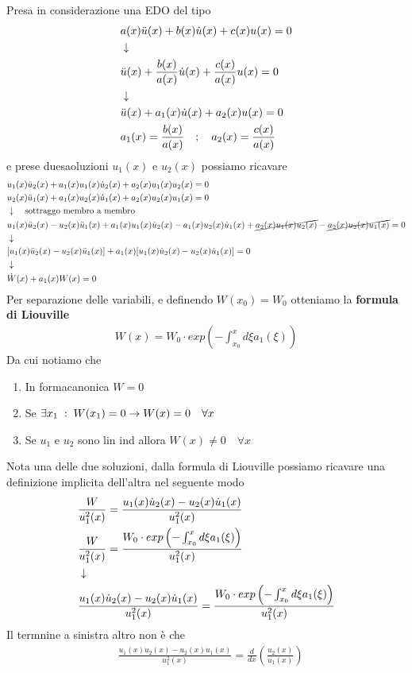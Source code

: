 Presa in considerazione una EDO del tipo
\begin{align}
	&a(x) \ddot{u}(x) + b(x) \dot{u}(x) + c(x) u(x) = 0 \\ &\downarrow \nonumber \\
	&\ddot{u}(x) + \frac{b(x)}{a(x)} \dot{u}(x) + \frac{c(x)}{a(x)} u(x) = 0\nonumber \\ &\downarrow \nonumber \\
	&\ddot{u}(x) + a_1(x) \dot{u}(x) + a_2(x) u(x) = 0 \\
	&a_1(x) =  \frac{b(x)}{a(x)} \quad ; \quad a_2(x)=\frac{c(x)}{a(x)}
\end{align}
e prese duesaoluzioni $u_1(x)$ e $u_2(x)$ possiamo ricavare
\begin{align}
	&u_1(x)\ddot{u}_2(x) + a_1(x) u_1(x)\dot{u}_2(x) + a_2(x) u_1(x)u_2(x) = 0 \\
	&u_2(x)\ddot{u}_1(x) + a_1(x) u_2(x)\dot{u}_1(x) + a_2(x) u_2(x)u_1(x) = 0\\ &\downarrow \quad \text{sottraggo membro a membro} \nonumber \\
	&u_1(x)\ddot{u}_2(x) - u_2(x)\ddot{u}_1(x) + a_1(x) u_1(x)\dot{u}_2(x) - a_1(x) u_2(x)\dot{u}_1(x) + \cancel{ a_2(x) u_1(x)u_2(x)} - \cancel{a_2(x) u_2(x)u_1(x)} = 0 \nonumber \\ &\downarrow \nonumber \\
	&[u_1(x)\ddot{u}_2(x) - u_2(x)\ddot{u}_1(x)]+ a_1(x) [  u_1(x)\dot{u}_2(x) - u_2(x)\dot{u}_1(x)] = 0\nonumber \\ &\downarrow \nonumber \\
	&\dot{W}(x) + a_1(x)W(x) = 0
\end{align}
Per separazione delle variabili, e definendo $W(x_0)=W_0$ otteniamo la \textbf{formula di Liouville}
\begin{align}
	W(x) = W_0\cdot exp\left( -\int_{x_0}^{x} d\xi a_1(\xi) \right)
\end{align}
Da cui notiamo che
\begin{enumerate}
	\item In formacanonica $W=0$
	\item Se $\exists x_1 \; : \; W(x_1) = 0 \to W(x) = 0\quad\forall x$
	\item Se $u_1$ e $u_2$ sono lin ind allora $W(x) \neq 0 \quad \forall x$
\end{enumerate}
Nota una delle due soluzioni, dalla formula di Liouville possiamo ricavare una definizione implicita dell'altra nel seguente modo
\begin{align}
	&\frac{W}{u_1^2(x)} = \frac{u_1(x)\dot{u}_2(x) - u_2(x)\dot{u}_1(x)}{u_1^2(x)}\\
	&\frac{W}{u_1^2(x)} = \frac{W_0\cdot exp\left( -\int_{x_0}^{x} d\xi a_1(\xi) \right)}{u_1^2(x)} \\ &\downarrow \nonumber \\
	&\frac{u_1(x)\dot{u}_2(x) - u_2(x)\dot{u}_1(x)}{u_1^2(x)} = \frac{W_0\cdot exp\left( -\int_{x_0}^{x} d\xi a_1(\xi) \right)}{u_1^2(x)}
\end{align}
Il termnine a sinistra altro non è che 
\begin{align}
&\frac{u_1(x)\dot{u}_2(x) - u_2(x)\dot{u}_1(x)}{u_1^2(x)} = \frac{d}{dx} \left( \frac{u_2(x)}{u_1(x)} \right)
\end{align}

